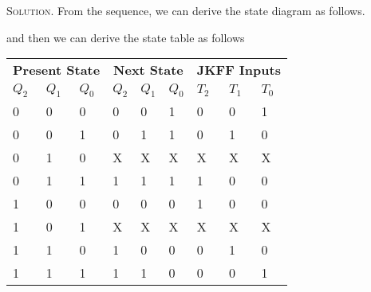 \documentclass[12pt, a4paper, oneside]{article}
\newenvironment{solution}{\par\noindent\textsc{Solution. }}{\\\par}
\begin{document}
\begin{solution}
    From the sequence, we can derive the state diagram as follows.
    \begin{figure}[!htbp]
        \centering
    \end{figure}
    \newline and then we can derive the state table as follows
    \begin{table}[!htbp]
        \centering
    \begin{tabular}{p{}<{\centering}p{}<{\centering}p{}<{\centering}p{}<{\centering}
        p{}<{\centering}p{}<{\centering}p{}<{\centering}p{}<{\centering}p{}<{\centering}}
        \toprule
        \multicolumn{3}{c}{\textbf{Present State}} & \multicolumn{3}{c}{\textbf{Next State}}& \multicolumn{3}{c}{\textbf{JKFF Inputs}} \\
        \cmidrule(lr){1-3}\cmidrule(lr){4-6}\cmidrule(lr){7-9}
        $Q_2$ & $Q_1$ & $Q_0$ & $Q_2$ & $Q_1$ & $Q_0$ & $T_2$ & $T_1$ & $T_0$ \\
        \midrule
        0 & 0 & 0 & 0 & 0 & 1 & 0 & 0 & 1 \\
        0 & 0 & 1 & 0 & 1 & 1 & 0 & 1 & 0 \\
        0 & 1 & 0 & X & X & X & X & X & X \\
        0 & 1 & 1 & 1 & 1 & 1 & 1 & 0 & 0 \\
        1 & 0 & 0 & 0 & 0 & 0 & 1 & 0 & 0 \\
        1 & 0 & 1 & X & X & X & X & X & X \\
        1 & 1 & 0 & 1 & 0 & 0 & 0 & 1 & 0 \\
        1 & 1 & 1 & 1 & 1 & 0 & 0 & 0 & 1 \\
        \bottomrule
    \end{tabular}

\end{table}
\end{solution}
\end{document}
